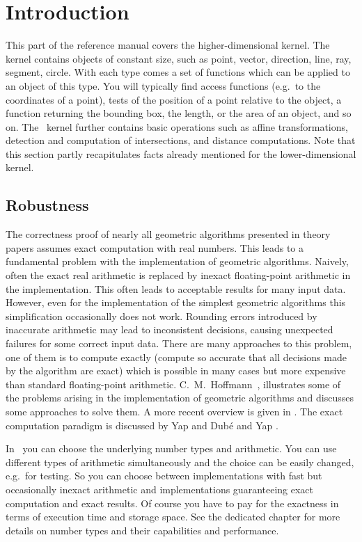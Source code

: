 \section{Introduction}

This part of the reference manual covers the higher-dimensional
kernel.  The kernel contains objects of constant size, such as point,
vector, direction, line, ray, segment, circle.  With each type comes a
set of functions which can be applied to an object of this type.  You
will typically find access functions (e.g.\ to the coordinates of a
point), tests of the position of a point relative to the object, a
function returning the bounding box, the length, or the area of an
object, and so on.  The \cgal\ kernel further contains basic
operations such as affine transformations, detection and computation
of intersections, and distance computations. Note that this section
partly recapitulates facts already mentioned for the lower-dimensional
kernel.

\subsection{Robustness}

The correctness proof of nearly all geometric algorithms presented in
theory papers assumes exact computation with real numbers.  This leads
to a fundamental problem with the implementation of geometric
algorithms.  Naively, often the exact real arithmetic is replaced by
inexact floating-point arithmetic in the implementation.  This often
leads to acceptable results for many input data.  However, even for
the implementation of the simplest geometric algorithms this
simplification occasionally does not work.  Rounding errors introduced
by inaccurate arithmetic may lead to inconsistent decisions, causing
unexpected failures for some correct input data.  There are many
approaches to this problem, one of them is to compute exactly (compute
so accurate that all decisions made by the algorithm are exact) which
is possible in many cases but more expensive than standard
floating-point arithmetic.  C.~M.~Hoffmann~\cite{h-gsm-89}, \cite{h-pargc-89}
illustrates some of the problems arising in the implementation of
geometric algorithms and discusses some approaches to solve them.  A
more recent overview is given in \cite{s-rpigc-00}.  The exact
computation paradigm is discussed by Yap and Dub\'e \cite{yd-ecp-95}
and Yap \cite{y-tegc-97}.

In \cgal\ you can choose the underlying number types and arithmetic.
You can use different types of arithmetic simultaneously and the
choice can be easily changed, e.g.\ for testing.  So you can choose
between implementations with fast but occasionally inexact arithmetic
and implementations guaranteeing exact computation and exact results.
Of course you have to pay for the exactness in terms of execution time
and storage space.  See the dedicated chapter for more details
on number types and their capabilities and performance.

